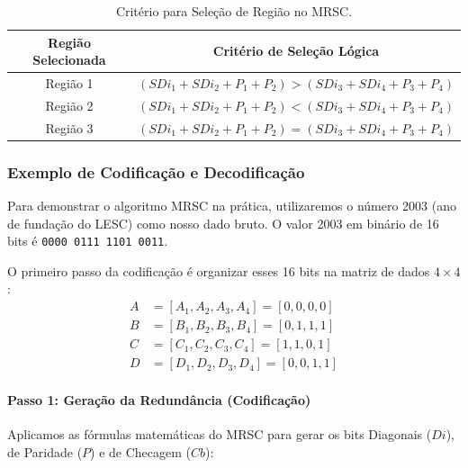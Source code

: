 \documentclass[12pt,a4paper]{article}
\begin{document}
\begin{table}[htpb]
\centering
\caption{Critério para Seleção de Região no MRSC.}
\label{tab:criterio_regiao}
\vspace{0.2cm}
\begin{tabular}{cc}
\toprule
\textbf{Região Selecionada} & \textbf{Critério de Seleção Lógica} \\
\midrule
Região 1 & $(SDi_1 + SDi_2 + P_1 + P_2) > (SDi_3 + SDi_4 + P_3 + P_4)$ \\
Região 2 & $(SDi_1 + SDi_2 + P_1 + P_2) < (SDi_3 + SDi_4 + P_3 + P_4)$ \\
Região 3 & $(SDi_1 + SDi_2 + P_1 + P_2) = (SDi_3 + SDi_4 + P_3 + P_4)$ \\
\bottomrule
\end{tabular}
\end{table}
\subsubsection{Exemplo de Codificação e Decodificação}

Para demonstrar o algoritmo MRSC na prática, utilizaremos o número 2003 (ano de fundação do LESC) como nosso dado bruto. O valor 2003 em binário de 16 bits é \texttt{0000 0111 1101 0011}. 

O primeiro passo da codificação é organizar esses 16 bits na matriz de dados $4 \times 4$:
\begin{align*}
    A &= [A_1, A_2, A_3, A_4] = [0, 0, 0, 0] \\
    B &= [B_1, B_2, B_3, B_4] = [0, 1, 1, 1] \\
    C &= [C_1, C_2, C_3, C_4] = [1, 1, 0, 1] \\
    D &= [D_1, D_2, D_3, D_4] = [0, 0, 1, 1]
\end{align*}

\paragraph{Passo 1: Geração da Redundância (Codificação)}
Aplicamos as fórmulas matemáticas do MRSC para gerar os bits Diagonais ($Di$), de Paridade ($P$) e de Checagem ($Cb$):
\end{document}
